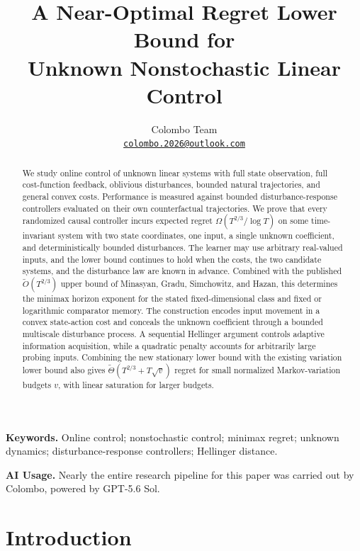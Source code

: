\documentclass[11pt]{article}
\title{A Near-Optimal Regret Lower Bound for\\
Unknown Nonstochastic Linear Control}
\author{Colombo Team\\[3pt]
\href{mailto:colombo.2026@outlook.com}{\texttt{colombo.2026@outlook.com}}}
\date{}
\theoremstyle{remark}
\begin{document}
\maketitle

\begin{abstract}
We study online control of unknown linear systems with full state observation,
full cost-function feedback, oblivious disturbances, bounded natural
trajectories, and general convex costs. Performance is measured against bounded disturbance-response
controllers evaluated on their own counterfactual trajectories. We prove that
every randomized causal controller incurs expected regret
$\Omega(T^{2/3}/\log T)$ on some time-invariant system with two state
coordinates, one input, a single unknown coefficient, and deterministically
bounded disturbances. The learner may use
arbitrary real-valued inputs, and the lower bound continues to hold when the
costs, the two candidate systems, and the disturbance law are known in advance.
Combined with the published $\widetilde O(T^{2/3})$ upper bound of Minasyan,
Gradu, Simchowitz, and Hazan, this determines the minimax horizon exponent for
the stated fixed-dimensional class and fixed or logarithmic comparator memory. The construction
encodes input movement in a convex state-action cost and conceals the unknown
coefficient through a bounded multiscale disturbance process. A sequential
Hellinger argument controls adaptive information acquisition, while a quadratic
penalty accounts for arbitrarily large probing inputs. Combining the new
stationary lower bound with the existing variation lower bound also gives
$\widetilde\Theta(T^{2/3}+T\sqrt v)$ regret for small normalized
Markov-variation budgets $v$, with linear saturation for larger budgets.
\end{abstract}

\noindent\textbf{Keywords.} Online control; nonstochastic control; minimax regret;
unknown dynamics; disturbance-response controllers; Hellinger distance.
\par\medskip
\begin{samepage}
\noindent\textbf{AI Usage.}
Nearly the entire research pipeline for this paper was carried out by
Colombo, powered by GPT-5.6 Sol.
\par
\end{samepage}

\section{Introduction}\label{sec:intro}
\end{document}
